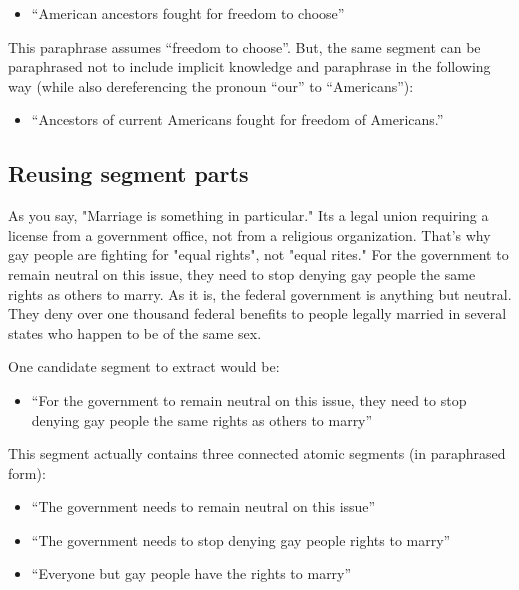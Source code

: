 \begin{itemize}
\item[] ``American ancestors fought for freedom to choose''
\end{itemize}
This paraphrase assumes ``freedom to choose''. But, the same segment can be
paraphrased not to include implicit knowledge and paraphrase in the following way 
(while also dereferencing the pronoun ``our'' to ``Americans''):
\begin{itemize}
\item[] ``Ancestors of current Americans fought for freedom of Americans.''
\end{itemize}

\subsection*{Reusing segment parts}

\begin{mydef}
As you say, "Marriage is something in particular." Its a legal union requiring
a license from a government office, not from a religious organization. That's
why gay people are fighting for "equal rights", not "equal rites."   For the
government to remain neutral on this issue, they need to stop denying gay
people the same rights as others to marry. As it is, the federal government is
anything but neutral. They deny over one thousand federal benefits to people
legally married in several states who happen to be of the same sex.
\end{mydef}
One candidate segment to extract would be:
\begin{itemize}
\item[] ``For the government to remain neutral on this issue, they need to stop
denying gay people the same rights as others to marry''
\end{itemize}
This segment actually contains three connected atomic segments (in paraphrased form):
\begin{itemize}
\item[] ``The government needs to remain neutral on this issue''
\item[] ``The government needs to stop denying gay people rights to marry''
\item[] ``Everyone but gay people have the rights to marry''
\end{itemize}


